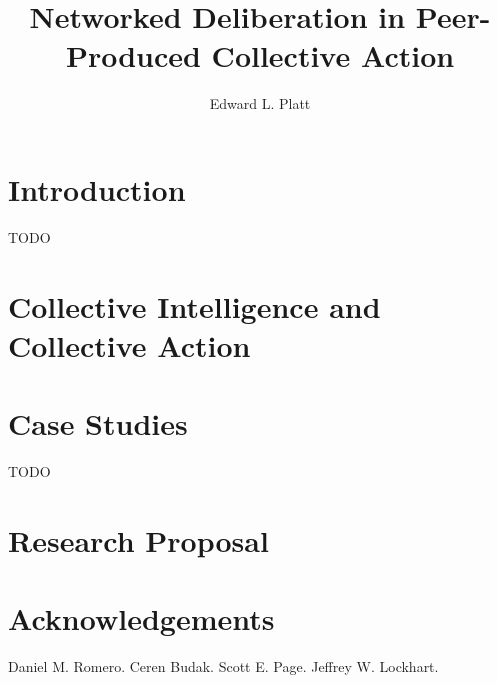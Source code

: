 \documentclass{book}
\author{Edward L. Platt}
\title{Networked Deliberation in Peer-Produced Collective Action}
\begin{document}
\maketitle

\chapter{Introduction}
TODO

\chapter{Collective Intelligence and Collective Action}


\chapter{Case Studies}
TODO

\chapter{Research Proposal}


\chapter{Acknowledgements}
Daniel M. Romero.
Ceren Budak.
Scott E. Page.
Jeffrey W. Lockhart.



\end{document}
